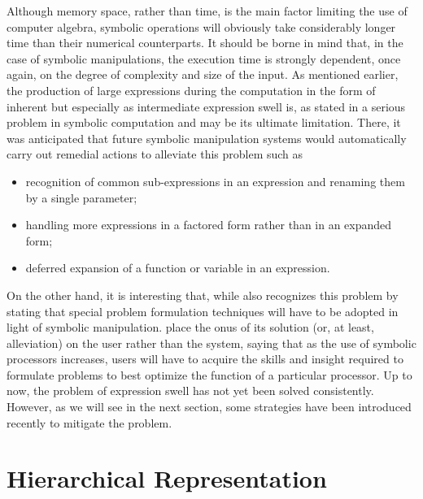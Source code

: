 Although memory space, rather than time, is the main factor limiting the use of computer algebra, symbolic operations will obviously take considerably longer time than their numerical counterparts. It should be borne in mind that, in the case of symbolic manipulations, the execution time is strongly dependent, once again, on the degree of complexity and size of the input. As mentioned earlier, the production of large expressions during the computation in the form of inherent but especially as intermediate expression swell is, as stated in \citet{noor1979computerized} a serious problem in symbolic computation and may be its ultimate limitation. There, it was anticipated that future symbolic manipulation systems would automatically carry out remedial actions to alleviate this problem such as
%
\begin{itemize}
  \setlength\itemsep{0em}
  \item recognition of common sub-expressions in an expression and renaming them by a single parameter;
  \item handling more expressions in a factored form rather than in an expanded form;
  \item deferred expansion of a function or variable in an expression.
\end{itemize}
%
On the other hand, it is interesting that, while \citet{korncoff1979symbolic} also recognizes this problem by stating that special problem formulation techniques will have to be adopted in light of symbolic manipulation. \citeauthor{korncoff1979symbolic} place the onus of its solution (or, at least, alleviation) on the user rather than the system, saying that as the use of symbolic processors increases, users will have to acquire the skills and insight required to formulate problems to best optimize the function of a particular processor. Up to now, the problem of expression swell has not yet been solved consistently. However, as we will see in the next section, some strategies have been introduced recently to mitigate the problem.


\section{Hierarchical Representation}
\label{chap2:sec:lem}

